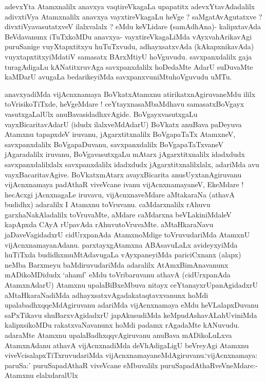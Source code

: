 \begin{artha}
adevxYta Atamxnalilx anavxya vaqtireVkagaLa upapatitx
adevxYtavAdadalilx adivxtiVya Atamxnalilx anavxya vayxtireVkagaLu heVge
? saMgatAvAgutatxve ? divxtiVyavasutatxveV ilalxvalalx ? eMdu keVLidare
\textbf(samAdhAna)- kalipxtavAda BeVdavanunx iTuTxkoMDu anavxya-
vayxtireVkagaLiMda vAyxvahArikavAgi puruSanige vuyXtapxtitxyu
huTuTxvudu, adhayxsatxvAda (kAkapxnikavAda) vuyxtapxtitxyiMdatiV
samasatx BArxMtiyU hoVguvudu. savxpanxdalilx gaja turagAdigaLu
kANatitxruvAga savxpanxdalilx hoDedaMte AdarU suDuvaMte kaMDarU
avugaLa bedarikeyiMda savxpanxvuniMtuhoVguvudu uMTu.
\end{artha}

\begin{artha}
anavxyadiMda vijAcnxnamaya BoVkatxAtamxnu atirikatxnAgiruvaneMdu ililx
toVrisi\-koTiTxde, heVgeMdare ! ceYtayxnasaMbaMdhavu samasatxBoVgayx
vasutxgaLalUlx anuBavasidadhx\-vAgide. BoVgayxvasutxgaLu
vayxBicaritavAdarU (idudx ilalxveMdAdarU) BoVkatx anuBava paDeyuva
Atamxnu tapapxdeV iruvanu, jAgarxtitxnalilx BoVgapaTaTx AtamxneV,
savxpanx\-dalilx BoVgapaDuvanu, savxpanxdalilx BoVgapaTaTxvaneV
jAgaradalilx iruvanu, BoVga\-vasutxgaLu mAtarx jAgarxtitxnalilx
idadxdudx savxpanxdalilxlalx savxpanxdalilx idadxdudx jAgarxtitxnalilxlalx,
adariMda avu vayxBacaritavAgive. BoVkatxmAtarx avayxBicarita
anusUyxtanAgiru\-vanu vijAcnxnamaya padAthaR viveVcane ivanu
vijAcnxnamayaneV, EkeMdare ! hecAcxgi jAcnxnagaLe iruvavu,
vijAcnxnaveMdare aMtakaraNa (athavA budidhx) adaralilx I Atamxnu
toVruvanu. caMdarxnalilx rAhuvu garxhaNakAladalilx toVruvaMte, aMdare
caMdarxna beVLakiniMdaleV kapApxda CAyA rUpavAda
rAhuvutoVruvaMte. aMtaHkaraNavu jaDaveVagidadxrU cidUrxpanAda
AtamxnoMdige toVruvudariMda AtamxnU
vijAcnxna\-mayanAdanu. parxtayxgAtamxna ABAsavuLaLx avideyxyiMda
huTiTxda budidhxmuMtAdavu\-gaLa vAyxpaneyiMda pariciCxnanx (alapx) neMba
Barxmeyu baMdiruvudariMda adaralilx AtAmxBimAnavanunx mADikoMDidudx
`ahamf' eMdu toVribaruvanu athavA (cidUrxpanAda AtamxnAdarU) Atamxnu
upalaBiBxeMbuva nitayx \-ceYtanayxrUpanAgidadxrU aMtaHkaraNadiMda
adhayxsatxvAgadakataqtavxvanunx hoMdi upalabadhxqqeMdAgiruvanu
ada\-riMda vijAcnxnamaya eMdu heVLalapxDuvanu saPxTikavu
shuBarxvAgidadxrU japAkusu\-diMda keMpudAshavALahUviniMda kalipxsikoMDu
rakatxvaNavanunx hoMdi padamx rAga\-daMte kANuvudu. adaraMte Atamxnu
upalaBadhxqqvAgiruvanu anuBava mADikoLuLxva AtamxnAdanu athavA
vijAcnxnadiMda deVhAdigaLigU beVreyAgi Atamxnu
viveVcisalapxTiTx\-ruvudariMda
vijAcnxnamayaneMdAgiruvanu.`vijAcnxnamaya: paruSa:' \-puruSapadAthaR
viveVcane eMbuvalilx puruSapadAthaRveVneMdare:- Atamxnu elalxdaralUlx

\end{artha}
